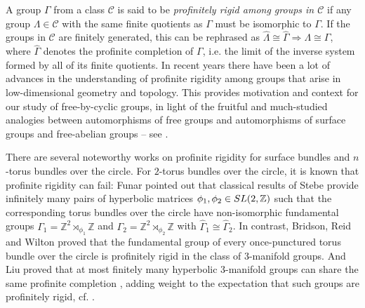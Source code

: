 \documentclass[11pt, a4 paper]{amsart}
\numberwithin{equation}{section}
\theoremstyle{remark}
\theoremstyle{definition}
\def\Z{\mathbb Z}
\def\G{\Gamma}
\def\wh{\widehat}
\def\La{\Lambda}
\def\G{\Gamma}
\begin{document}
A group $\G$ from a class $\mathcal{C}$ is said to be 
{\em profinitely rigid among groups in $\mathcal{C}$} 
if any group $\La\in\mathcal{C}$ 
with the same finite quotients as $\G$ 
must be isomorphic to $\G$. 
If the groups in $\mathcal{C}$ are finitely generated, 
this can be rephrased as 
$\wh{\La}\cong\wh{\G} \Longrightarrow \La\cong\G$, 
where $\wh{\G}$ denotes the profinite completion of $\G$, 
i.e. the limit of the inverse system 
formed by all of its finite quotients. 
In recent years there have been a lot of advances 
in the understanding of profinite rigidity 
among groups that arise 
in low-dimensional geometry and topology. 
This provides motivation and context 
for our study of free-by-cyclic groups, 
in light of the fruitful and much-studied 
analogies between automorphisms of free groups
and automorphisms of surface groups 
and free-abelian groups -- 
see \cite{bestvina2003topology, bridson2006automorphism}.

There are several noteworthy works on profinite rigidity for
surface bundles and $n$-torus bundles over the circle.
For $2$-torus bundles over the circle, it is known that 
profinite rigidity can fail: 
Funar \cite{funar2013torus} pointed out that 
classical results of Stebe \cite{stebe1972conjugacy} 
provide infinitely many pairs of hyperbolic matrices 
$\phi_1,\phi_2\in{\rm{SL}}(2,\Z)$ 
such that the corresponding torus bundles over the circle 
have non-isomorphic fundamental groups 
$\G_1=\Z^2\rtimes_{\phi_1}\Z$ and $\G_2=\Z^2\rtimes_{\phi_2}\Z$
with $\wh{\G}_1\cong \wh{\G}_2$. 
In contrast, 
Bridson, Reid and Wilton \cite{bridson2017profinite} proved that 
the fundamental group of 
every once-punctured torus bundle over the circle 
is profinitely rigid in the class of 3-manifold groups. 
And Liu proved that at most finitely many 
hyperbolic 3-manifold groups 
can share the same profinite completion \cite{liu2023finite}, 
adding weight to the expectation 
that such groups are profinitely rigid, cf. 
\cite{bridson2021profinite}. 
\end{document}
